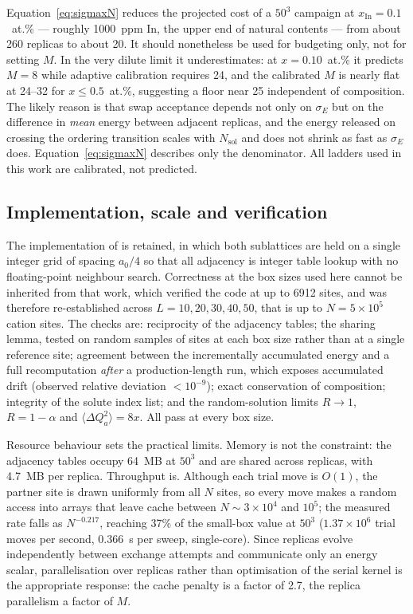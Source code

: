 \documentclass[11pt,a4paper]{article}
\newcommand{\dQ}{\Delta Q}
\newcommand{\Nsol}{N_{\mathrm{sol}}}
\begin{document}
Equation~\eqref{eq:sigmaxN} reduces the projected cost of a $50^3$ campaign at
$x_{\mathrm{In}} = 0.1$~at.\% --- roughly 1000~ppm In, the upper end of natural
contents --- from about 260 replicas to about 20. It should nonetheless be used
for budgeting only, not for setting $M$. In the very dilute limit it
underestimates: at $x = 0.10$~at.\% it predicts $M = 8$ while adaptive
calibration requires 24, and the calibrated $M$ is nearly flat at 24--32 for
$x \le 0.5$~at.\%, suggesting a floor near 25 independent of composition. The
likely reason is that swap acceptance depends not only on $\sigma_E$ but on the
difference in \emph{mean} energy between adjacent replicas, and the energy
released on crossing the ordering transition scales with $\Nsol$ and does not
shrink as fast as $\sigma_E$ does. Equation~\eqref{eq:sigmaxN} describes only the
denominator. All ladders used in this work are calibrated, not predicted.

\subsection{Implementation, scale and verification}
\label{sec:verification}

The implementation of \citet{yu2026} is retained, in which both sublattices are
held on a single integer grid of spacing $a_0/4$ so that all adjacency is
integer table lookup with no floating-point neighbour search. Correctness at the
box sizes used here cannot be inherited from that work, which verified the code
at up to 6912 sites, and was therefore re-established across
$L = 10, 20, 30, 40, 50$, that is up to $N = 5\times10^5$ cation sites. The
checks are: reciprocity of the adjacency tables; the sharing lemma, tested on
random samples of sites at each box size rather than at a single reference site;
agreement between the incrementally accumulated energy and a full recomputation
\emph{after} a production-length run, which exposes accumulated drift (observed
relative deviation $<10^{-9}$); exact conservation of composition; integrity of
the solute index list; and the random-solution limits $R \to 1$,
$R = 1 - \alpha$ and $\langle\dQ_a^2\rangle = 8x$. All pass at every box size.

Resource behaviour sets the practical limits. Memory is not the constraint: the
adjacency tables occupy 64~MB at $50^3$ and are shared across replicas, with
4.7~MB per replica. Throughput is. Although each trial move is $O(1)$, the
partner site is drawn uniformly from all $N$ sites, so every move makes a random
access into arrays that leave cache between $N \sim 3\times10^4$ and $10^5$; the
measured rate falls as $N^{-0.217}$, reaching 37\% of the small-box value at
$50^3$ ($1.37\times10^6$ trial moves per second, 0.366~s per sweep,
single-core). Since replicas evolve independently between exchange attempts and
communicate only an energy scalar, parallelisation over replicas rather than
optimisation of the serial kernel is the appropriate response: the cache penalty
is a factor of 2.7, the replica parallelism a factor of $M$.
\end{document}
